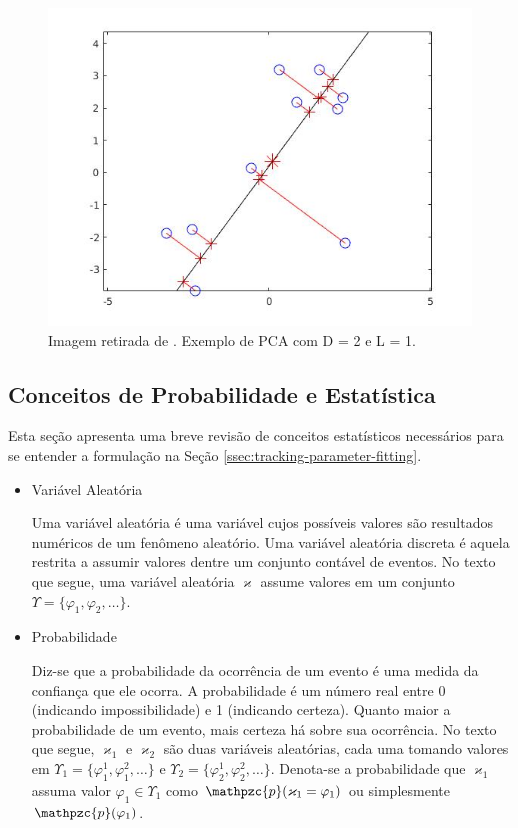 {\begin{figure}[!htb]
    \centering
    \includegraphics[width=0.8\linewidth]{./figs/pcaDemo.jpg}
% 
    \caption{Imagem retirada de \cite{machine-learning-book}. Exemplo de PCA com D = 2 e L = 1.}
    \label{fig:PCA}
\end{figure}





\subsection{Conceitos de Probabilidade e Estatística}
\label{ssec:review-probabilidade}

Esta seção apresenta uma breve revisão de conceitos estatísticos necessários para se entender a formulação na Seção \ref{ssec:tracking-parameter-fitting}.

\begin{itemize}

\item Variável Aleatória

Uma variável aleatória é uma variável cujos possíveis valores são resultados numéricos de um fenômeno aleatório. Uma variável aleatória discreta é aquela restrita a assumir valores dentre um conjunto contável de eventos. No texto que segue, uma variável aleatória $\varkappa$ assume valores em um conjunto $\Upsilon = \{\varphi_1, \varphi_2, \ldots\}$.

\item Probabilidade

Diz-se que a probabilidade da ocorrência de um evento é uma medida da confiança que ele ocorra. A probabilidade é um número real entre 0 (indicando impossibilidade) e 1 (indicando certeza). Quanto maior a probabilidade de um evento, mais certeza há sobre sua ocorrência. No texto que segue, $\varkappa_1$ e $\varkappa_2$ são duas variáveis aleatórias, cada uma tomando valores em $\Upsilon _1 = \{\varphi_1^1, \varphi_1^2, \ldots\}$ e $\Upsilon_2 = \{\varphi_2^1, \varphi_2^2, \ldots\}$. Denota-se a probabilidade que $\varkappa_1$ assuma valor $\varphi_1 \in \Upsilon_1$ como $\mathpzc{p}(\varkappa_1 = \varphi_1)$ ou simplesmente $\mathpzc{p}(\varphi_1)$.


\end{itemize}}
